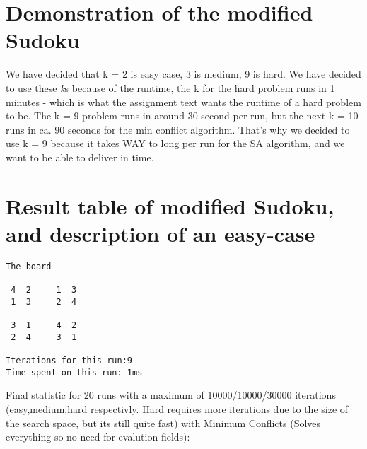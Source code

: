 \documentclass[12pt, a4paper]{article}
\begin{document}
\section{Demonstration of the modified Sudoku}
We have decided that k = 2 is easy case, 3 is medium, 9 is hard. 
We have decided to use these \textit{k}s because of the runtime, the k for the hard problem runs in 1 minutes - which is what the assignment text wants the runtime of a hard problem to be. The k = 9 problem runs in around 30 second per run, but the next k = 10 runs in ca. 90 seconds for the min conflict algorithm. That's why we decided to use k = 9 because it takes WAY to long per run for the SA algorithm, and we want to be able to deliver in time.

\section{Result table of modified Sudoku, and description of an easy-case}
\begin{verbatim}
The board

 4  2     1  3 
 1  3     2  4 

 3  1     4  2 
 2  4     3  1 
 
Iterations for this run:9
Time spent on this run: 1ms
\end{verbatim}

\noindent
Final statistic for 20 runs with a maximum of 10000/10000/30000 iterations (easy,medium,hard respectivly. Hard requires more iterations due to the size of the search space, but its still quite fast) with Minimum Conflicts (Solves everything so no need for evalution fields):
\end{document}

